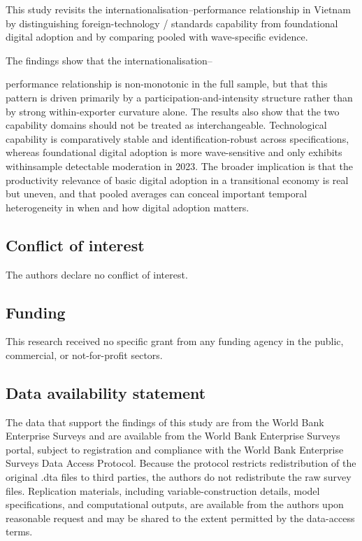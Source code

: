 \documentclass[12pt,a4paper]{article}
\begin{document}
This study revisits the internationalisation--performance relationship
in Vietnam by distinguishing foreign-technology / standards capability
from foundational digital adoption and by comparing pooled with
wave-specific evidence.

The findings show that the internationalisation--

performance relationship is non-monotonic in the full sample, but that
this pattern is driven primarily by a participation-and-intensity
structure rather than by strong within-exporter curvature alone. The
results also show that the two capability domains should not be treated
as interchangeable. Technological capability is comparatively stable and
identification-robust across specifications, whereas foundational
digital adoption is more wave-sensitive and only exhibits withinsample
detectable moderation in 2023. The broader implication is that the
productivity relevance of basic digital adoption in a transitional
economy is real but uneven, and that pooled averages can conceal
important temporal heterogeneity in when and how digital adoption
matters.

\hypertarget{conflict-of-interest}{%
\subsection{Conflict of interest}\label{conflict-of-interest}}

The authors declare no conflict of interest.

\hypertarget{funding}{%
\subsection{Funding}\label{funding}}

This research received no specific grant from any funding agency in the
public, commercial, or not-for-profit sectors.

\hypertarget{data-availability-statement}{%
\subsection{Data availability
statement}\label{data-availability-statement}}

The data that support the findings of this study are from the World Bank
Enterprise Surveys and are available from the World Bank Enterprise
Surveys portal, subject to registration and compliance with the World
Bank Enterprise Surveys Data Access Protocol. Because the protocol
restricts redistribution of the original .dta files to third parties,
the authors do not redistribute the raw survey files. Replication
materials, including variable-construction details, model
specifications, and computational outputs, are available from the
authors upon reasonable request and may be shared to the extent
permitted by the data-access terms.
\end{document}
